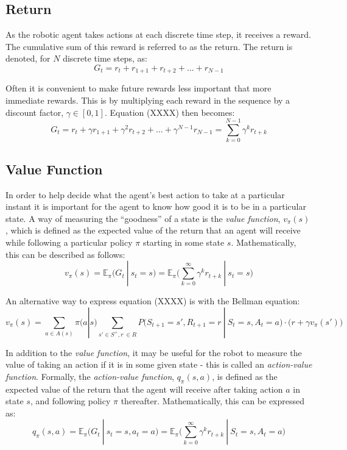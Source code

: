 \documentclass[a4paper]{article}
\begin{document}
\subsection{Return}
As the robotic agent takes actions at each discrete time step, it receives a reward. The cumulative sum of this reward is referred to as the return. The return is denoted, for $N$ discrete time steps, as:
\begin{equation}
G_t = r_t + r_{1+1} + r_{t+2} + \ldots + r_{N-1}
\end{equation}

Often it is convenient to make future rewards less important that more immediate rewards. This is by multiplying each reward in the sequence by a discount factor, $\gamma \in [0,1]$. Equation (XXXX) then becomes:
\begin{equation}
G_t = r_t + \gamma r_{1+1} + \gamma^2 r_{t+2} + \ldots + \gamma^{N-1} r_{N-1} = \sum_{k = 0}^{N-1} \gamma^k r_{t+k}
\end{equation} 

\subsection{Value Function}
In order to help decide what the agent's best action to take at a particular instant it is important for the agent to know how good it is to be in a particular state. A way of measuring the ``goodness'' of a state is the \textit{value function}, $v_{\pi}(s)$, which is defined as the expected value of the return that an agent will receive while following a particular policy $\pi$ starting in some state $s$. Mathematically, this can be described as follows:
\begin{equation}
v_{\pi}(s) = \mathbb{E}_{\pi} ( G_t \ | \ s_t = s ) = \mathbb{E}_{\pi} \bigg( \sum_{k=0}^{\infty} \gamma^k r_{t+k} \ | \ s_t = s \bigg)
\end{equation}

An alternative way to express equation (XXXX) is with the Bellman equation:
\begin{equation}
v_{\pi}(s) = \sum_{a \in A(s)} \pi\big(a | s\big) \sum_{s' \in S^+, r \ \in R} P\big(S_{t+1}=s', R_{t+1} = r \ | \ S_t=s, A_t=a\big) \cdot \big(r + \gamma v_{\pi}(s')\big)
\end{equation} 

In addition to the \textit{value function}, it may be useful for the robot to measure the value of taking an action if it is in some given state - this is called an \textit{action-value function}. Formally, the \textit{action-value function}, $q_{\pi}(s,a)$, is defined as the expected value of the return that the agent will receive after taking action $a$ in state $s$, and following policy $\pi$ thereafter. Mathematically, this can be expressed as:
\begin{equation}
q_{\pi}(s,a) = \mathbb{E}_{\pi} (G_t \ | \ s_t = s, a_t = a) = \mathbb{E}_{\pi} \bigg( \sum_{k=0}^{\infty} \gamma^k r_{t+k} \ | \ S_t=s, A_t=a \bigg)
\end{equation}
\end{document}
